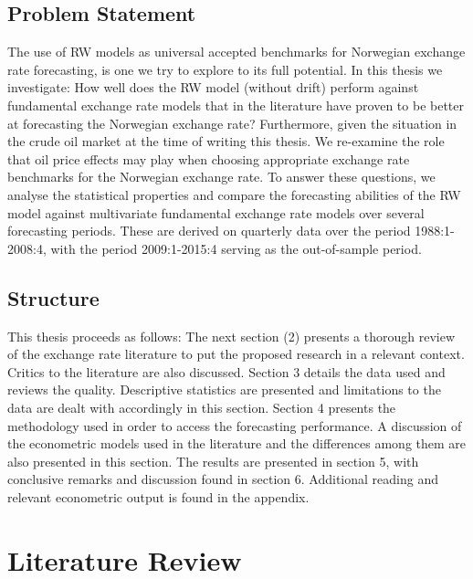 \documentclass[10pt]{article}
\numberwithin{equation}{section}
\numberwithin{table}{section}
\numberwithin{figure}{section}
\begin{document}
\begin{spacing}{1.5}
\subsection{Problem Statement}
The use of RW models as universal accepted benchmarks for Norwegian exchange rate forecasting, is one we try to explore to its full potential. In this thesis we investigate: How well does the RW model (without drift) perform against fundamental exchange rate models that in the literature have proven to be better at forecasting the Norwegian exchange rate? Furthermore, given the situation in the crude oil market at the time of writing this thesis. We re-examine the role that oil price effects may play when choosing appropriate exchange rate benchmarks for the Norwegian exchange rate. To answer these questions, we analyse the statistical properties and compare the forecasting abilities of the RW model against multivariate fundamental exchange rate models over several forecasting periods. These are derived on quarterly data over the period 1988:1-2008:4, with the period 2009:1-2015:4 serving as the out-of-sample period.

\subsection{Structure}
This thesis proceeds as follows: The next section (2) presents a thorough review of the exchange rate literature to put the proposed research in a relevant context. Critics to the literature are also discussed. Section 3 details the data used and reviews the quality. Descriptive statistics are presented and limitations to the data are dealt with accordingly in this section. Section 4 presents the methodology used in order to access the forecasting performance. A discussion of the econometric models used in the literature and the differences among them are also presented in this section. The results are presented in section 5, with conclusive remarks and discussion found in section 6. Additional reading and relevant econometric output is found in the appendix.

\section{Literature Review}
\label{sec:lit}


\end{spacing}
\end{document}
